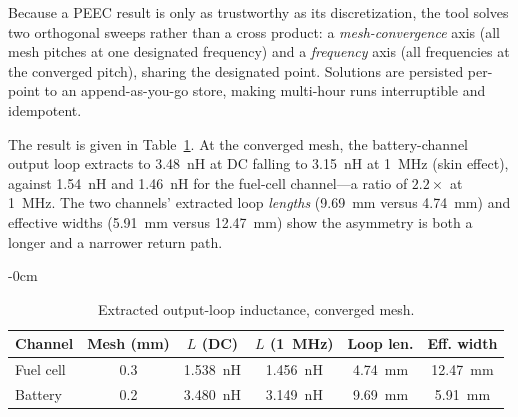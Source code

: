 
Because a PEEC result is only as trustworthy as its discretization, the tool solves
two orthogonal sweeps rather than a cross product: a \emph{mesh-convergence} axis
(all mesh pitches at one designated frequency) and a \emph{frequency} axis (all
frequencies at the converged pitch), sharing the designated point. Solutions are
persisted per-point to an append-as-you-go store, making multi-hour runs
interruptible and idempotent.

The result is given in Table~\ref{tab:Lsweep}. At the converged mesh, the
battery-channel output loop extracts to \SI{3.48}{\nano\henry} at DC falling to
\SI{3.15}{\nano\henry} at \SI{1}{\mega\hertz} (skin effect), against
\SI{1.54}{\nano\henry} and \SI{1.46}{\nano\henry} for the fuel-cell channel---a
ratio of $2.2\times$ at \SI{1}{\mega\hertz}. The two channels' extracted loop
\emph{lengths} (\SI{9.69}{\milli\meter} versus \SI{4.74}{\milli\meter}) and
effective widths (\SI{5.91}{\milli\meter} versus \SI{12.47}{\milli\meter}) show the
asymmetry is both a longer and a narrower return path.


\begin{table}[H]
\caption{Extracted output-loop inductance, converged mesh.\label{tab:Lsweep}}
\begin{adjustwidth}{-\extralength}{0cm}
\centering
\begin{tabular}{lccccc}
\toprule
\textbf{Channel} & \textbf{Mesh (mm)} & $L$ \textbf{(DC)} & $L$ \textbf{(\SI{1}{\mega\hertz})} & \textbf{Loop len.} & \textbf{Eff. width} \\
\midrule
Fuel cell & 0.3 & \SI{1.538}{\nano\henry} & \SI{1.456}{\nano\henry} & \SI{4.74}{\milli\meter} & \SI{12.47}{\milli\meter} \\
Battery   & 0.2 & \SI{3.480}{\nano\henry} & \SI{3.149}{\nano\henry} & \SI{9.69}{\milli\meter} & \SI{5.91}{\milli\meter} \\
\bottomrule
\end{tabular}
\end{adjustwidth}
\end{table}

